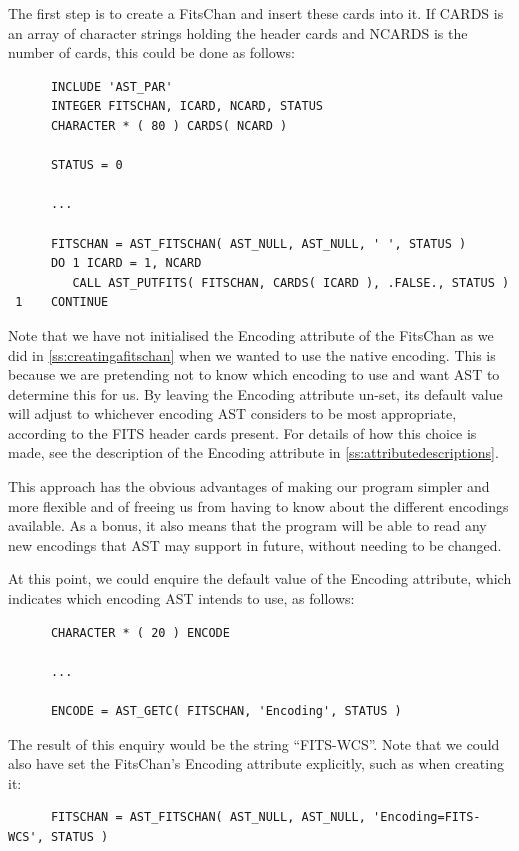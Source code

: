\documentclass[twoside,11pt]{article}
\newcommand{\htmlref}[2]{#1}
\newcommand{\appref}[1]{Appendix~\ref{#1}}
\newcommand{\secref}[1]{\S\ref{#1}}
\renewcommand{\appref}[1]{\ref{#1}}
\renewcommand{\secref}[1]{\ref{#1}}
\begin{document}
The first step is to create a \htmlref{FitsChan}{FitsChan} and insert these cards into
it. If CARDS is an array of character strings holding the header cards
and NCARDS is the number of cards, this could be done as follows:

\small
\begin{verbatim}
      INCLUDE 'AST_PAR'
      INTEGER FITSCHAN, ICARD, NCARD, STATUS
      CHARACTER * ( 80 ) CARDS( NCARD )

      STATUS = 0

      ...

      FITSCHAN = AST_FITSCHAN( AST_NULL, AST_NULL, ' ', STATUS )
      DO 1 ICARD = 1, NCARD
         CALL AST_PUTFITS( FITSCHAN, CARDS( ICARD ), .FALSE., STATUS )
 1    CONTINUE
\end{verbatim}
\normalsize

Note that we have not initialised the \htmlref{Encoding}{Encoding} attribute of the
FitsChan as we did in \secref{ss:creatingafitschan} when we wanted to
use the native encoding. This is because we are pretending not to know
which encoding to use and want AST to determine this for us. By
leaving the Encoding attribute un-set, its default value will adjust
to whichever encoding AST considers to be most appropriate, according
to the FITS header cards present. For details of how this choice is
made, see the description of the Encoding attribute in
\appref{ss:attributedescriptions}.

This approach has the obvious advantages of making our program simpler
and more flexible and of freeing us from having to know about the
different encodings available. As a bonus, it also means that the
program will be able to read any new encodings that AST may support in
future, without needing to be changed.

At this point, we could enquire the default value of the Encoding
attribute, which indicates which encoding AST intends to use, as
follows:

\small
\begin{verbatim}
      CHARACTER * ( 20 ) ENCODE

      ...

      ENCODE = AST_GETC( FITSCHAN, 'Encoding', STATUS )
\end{verbatim}
\normalsize

The result of this enquiry would be the string ``FITS-WCS''.  Note
that we could also have set the FitsChan's Encoding attribute
explicitly, such as when creating it:

\small
\begin{verbatim}
      FITSCHAN = AST_FITSCHAN( AST_NULL, AST_NULL, 'Encoding=FITS-WCS', STATUS )
\end{verbatim}
\normalsize
\end{document}
